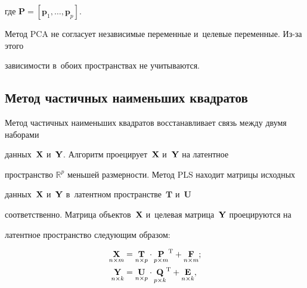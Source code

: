 \vspace*{-2pt}



\noindent

где $\textbf{P} = [\textbf{p}_1, \dots, \textbf{p}_{p}].$

Метод PCA не согласует независимые переменные и~целевые переменные. Из-за этого 

зависимости в~обоих пространствах не учитываются.





\subsection{Метод частичных наименьших квадратов}



Метод частичных наименьших квадратов восстанавливает связь между двумя наборами 

данных~$\mathbf{X}$ и~$\mathbf{Y}$. Алгоритм проецирует~$\mathbf{X}$ и~$\mathbf{Y}$ на латентное 

пространство $\mathbb{R}^{p}$ меньшей размерности. Метод PLS находит матрицы исходных 

данных~$\mathbf{X}$ и~$\mathbf{Y}$ в~латентном пространстве~$\textbf{T}$ и~$\textbf{U}$ 

соответственно. Матрица объектов~$\mathbf{X}$ и~целевая матрица~$\mathbf{Y}$ проецируются на 

латентное пространство следующим образом:



\noindent

\begin{align*}

    \underset{n \times m}{\bX}  &= \underset{n \times p}{\textbf{T}} \cdot 

\underset{p \times m}{\textbf{P}}^{\mathrm{T}} +  \underset{n \times m}{\textbf{F}};\\


    \underset{n \times k}{\bY}  &= \underset{n \times p}{\textbf{U}} \cdot 

\underset{p \times k}{\bQ}^{\mathrm{T}} + \underset{n \times k}{\textbf{E}},


\end{align*}



\vspace*{-2pt}




